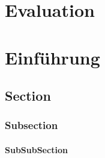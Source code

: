 \chapter{Evaluation}

\chapter{Einführung}

\section{Section}
 
\subsection{Subsection}
 
\subsubsection{SubSubSection}